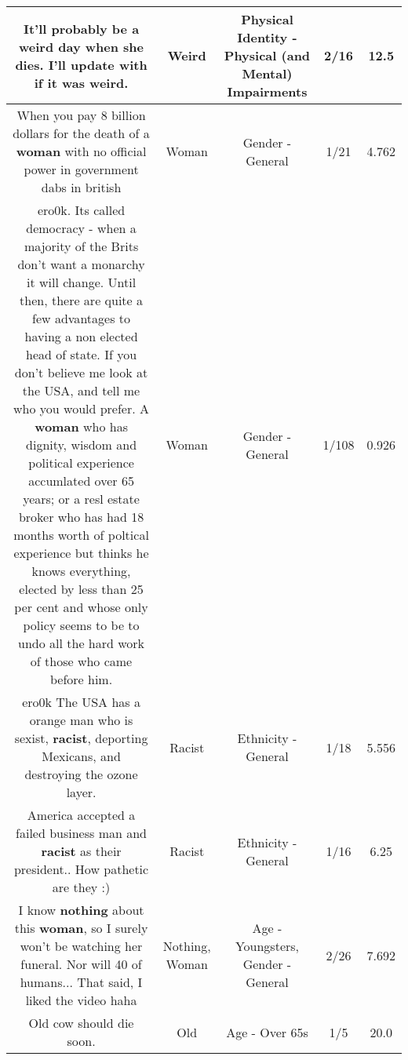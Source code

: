 \documentclass[11pt]{article}
\newlength\mylength
\begin{document}
\begin{center}
\begin{longtable}{|C{.65\mylength}|C{.30\mylength}|C{.12\mylength}|C{.12\mylength}|C{.12\mylength}|}
  \small It'll probably be a \textbf{weird} day when she dies. I'll update with if it was \textbf{weird}.\normalsize   & Weird & Physical Identity - Physical (and Mental) Impairments & 2/16 & 12.5 \\  \hline
  \small When you pay 8 billion dollars for the death of a \textbf{woman} with no official power in government dabs in british\normalsize   & Woman & Gender - General & 1/21 & 4.762 \\  \hline
  \small ero0k.  Its called democracy - when a majority of the Brits don't want a monarchy it will change.  Until then, there are quite a few advantages to having a non elected head of state.  If you don't believe me look at the USA, and tell me who you would prefer. A \textbf{woman} who has dignity, wisdom and political experience accumlated over 65 years; or a resl estate broker who has had 18 months worth of poltical experience but thinks he knows everything, elected by less than 25 per cent and whose only policy seems to be to undo all the hard work of those who came before him.\normalsize   & Woman & Gender - General & 1/108 & 0.926 \\  \hline
  \small ero0k The USA has a orange man who is sexist, \textbf{racist}, deporting Mexicans, and destroying the ozone layer.\normalsize   & Racist & Ethnicity - General & 1/18 & 5.556 \\  \hline
  \small America accepted a failed business man and \textbf{racist} as their president.. How pathetic are they :)\normalsize   & Racist & Ethnicity - General & 1/16 & 6.25 \\  \hline
  \small I know \textbf{nothing} about this \textbf{woman}, so I surely won't be watching her funeral. Nor will 40 of humans... That said, I liked the video haha\normalsize   & Nothing, Woman & Age - Youngsters, Gender - General & 2/26 & 7.692 \\  \hline
  \small Old cow should die soon.\normalsize   & Old & Age - Over 65s & 1/5 & 20.0 \\  \hline

\end{longtable}
\end{center}
\end{document}
